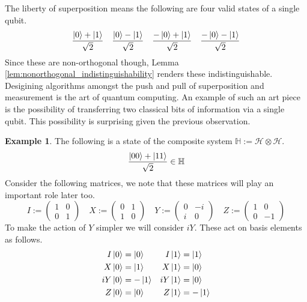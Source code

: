 \documentclass[12pt]{article}
\theoremstyle{plain}
\theoremstyle{definition}
\newtheorem{example}[thm]{Example}
\newcommand{\bb}[1]{\mathbb{#1}}
\newcommand{\call}[1]{\mathcal{#1}}
\begin{document}
The liberty of superposition means the following are four valid states of a single qubit.
\begin{equation}
	\frac{\ket{0} + \ket{1}}{\sqrt{2}}\quad \frac{\ket{0} - \ket{1}}{\sqrt{2}}\quad  \frac{-\ket{0} + \ket{1}}{\sqrt{2}} \quad \frac{-\ket{0} - \ket{1}}{\sqrt{2}}
	\end{equation}
Since these are non-orthogonal though, Lemma \ref{lem:nonorthogonal_indistinguishability} renders these indistinguishable. Desigining algorithms amongst the push and pull of superposition and measurement is the art of quantum computing. An example of such an art piece is the possibility of transferring two classical bits of information via a single qubit. This possibility is surprising given the previous observation.

	\begin{example}\label{ex:2_bits}
		The following is a state of the composite system $\bb{H} := \call{H} \otimes \call{H}$.
		\begin{equation}\label{eq:bell}
			\frac{\ket{00} + \ket{11}}{\sqrt{2}} \in \bb{H}
		\end{equation}
		Consider the following matrices, we note that these matrices will play an important role later too.
		\begin{equation}\label{eq:pauli}
			I :=
			\begin{pmatrix}
				1 & 0\\
				0 & 1
			\end{pmatrix}
			\quad
			X :=
			\begin{pmatrix}
				0 &1\\
				1 &0
			\end{pmatrix}
			\quad
			Y :=
			\begin{pmatrix}
				0 & -i\\
				i & 0
			\end{pmatrix}
			\quad
			Z :=
			\begin{pmatrix}
				1 & 0\\
				0 & -1
			\end{pmatrix}
		\end{equation}
		To make the action of $Y$ simpler we will consider $iY$. These act on basis elements as follows.
		\begin{align*}
			I\ket{0} &= \ket{0} & I\ket{1} &= \ket{1}\\
			X\ket{0} &= \ket{1} & X\ket{1} &= \ket{0}\\
			iY\ket{0} &= -\ket{1} & iY \ket{1} &= \ket{0}\\
			Z\ket{0} &= \ket{0} & Z\ket{1} &=-\ket{1}

\end{align*}
\end{example}
\end{document}
